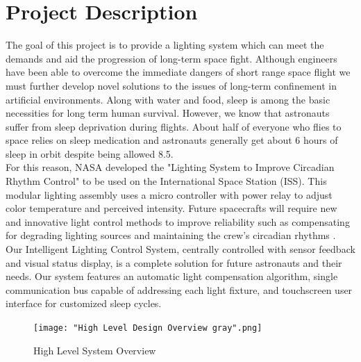 \documentclass[12pt,a4paper]{report}
\begin{document}
\section{Project Description}
The goal of this project is to provide a lighting system which can meet the demands and aid the progression of long-term space fight. Although engineers have been able to overcome the immediate dangers of short range space flight we must further develop novel solutions to the issues of long-term confinement in artificial environments. Along with water and food, sleep is among the basic necessities for long term human survival. However, we know that astronauts suffer from sleep deprivation during flights. About half of everyone who flies to space relies on sleep medication and astronauts generally get about 6 hours of sleep in orbit despite being allowed 8.5.\cite{spacesleep}\\ \linebreak 
For this reason, NASA developed the "Lighting System to Improve Circadian Rhythm Control" to be used on the International Space Station (ISS). \cite{nasapatent} This modular lighting assembly uses a micro controller with power relay to adjust color temperature and perceived intensity. Future spacecrafts will require new and innovative light control methods to improve reliability such as compensating for degrading lighting sources and maintaining the crew's circadian rhythms \cite{tsgc}. \\ \linebreak
Our Intelligent Lighting Control System, centrally controlled with sensor feedback and visual status display, is a complete solution for future astronauts and their needs. Our system features an automatic light compensation algorithm, single communication bus capable of addressing each light fixture, and touchscreen user interface for customized sleep cycles. 


\begin{figure}[H]
	\centering
	\texttt{[image: "High Level Design Overview gray".png]}\par			\vspace{0.1cm}
	\caption{High Level System Overview}
\end{figure}
\end{document}
